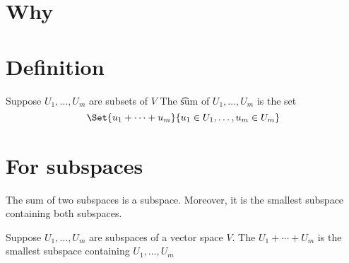 
\section*{Why}



\section*{Definition}

Suppose $U_1, \dots , U_m$ are subsets of $V$
The \t{sum} of $U_1, \dots , U_m$ is the set
\[
\Set{u_1 + \cdots + u_m}{u_1 \in U_1, \dots , u_m \in U_m}
\]

\section*{For subspaces}

The sum of two subspaces is a subspace.
Moreover, it is the smallest subspace containing both subspaces.

\begin{proposition}
Suppose $U_1, \dots , U_m$ are subspaces of a vector space $V$.
The $U_1 + \cdots + U_m$ is the smallest subspace containing $U_1, \dots , U_m$
\end{proposition}

\blankpage
